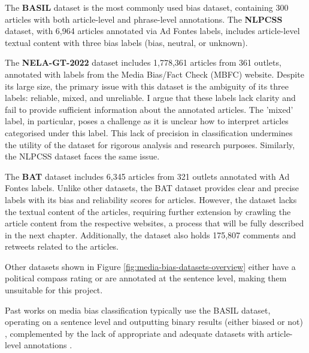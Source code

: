 The \textbf{BASIL} dataset \cite{fan-2019-basil} is the most commonly used bias dataset, containing 300 articles with both article-level and phrase-level annotations. The \textbf{NLPCSS} \cite{chen-2020-nlpcss} dataset, with 6,964 articles annotated via Ad Fontes labels, includes article-level textual content with three bias labels (bias, neutral, or unknown).

The \textbf{NELA-GT-2022} dataset \cite{gruppi-2023-nela-gt-2022} includes 1,778,361 articles from 361 outlets, annotated with labels from the Media Bias/Fact Check (MBFC) \cite{mbfc} website. Despite its large size, the primary issue with this dataset is the ambiguity of its three labels: reliable, mixed, and unreliable. I argue that these labels lack clarity and fail to provide sufficient information about the annotated articles. The 'mixed' label, in particular, poses a challenge as it is unclear how to interpret articles categorised under this label. This lack of precision in classification undermines the utility of the dataset for rigorous analysis and research purposes. Similarly, the NLPCSS dataset faces the same issue.

The \textbf{BAT} dataset \cite{spinde-2023-bat} includes 6,345 articles from 321 outlets annotated with Ad Fontes labels. Unlike other datasets, the BAT dataset provides clear and precise labels with its bias and reliability scores for articles. However, the dataset lacks the textual content of the articles, requiring further extension by crawling the article content from the respective websites, a process that will be fully described in the next chapter. Additionally, the dataset also holds 175,807 comments and retweets related to the articles.

Other datasets shown in Figure \ref{fig:media-bias-datasets-overview} either have a political compass rating or are annotated at the sentence level, making them unsuitable for this project.

Past works on media bias classification typically use the BASIL dataset, operating on a sentence level and outputting binary results (either biased or not) \cite{maab-2023-lexical-bias-detection, maab-2023-target-aware, guo-2022-modeling, van-den-berg-2020-context,lee-2021-unifying,lei-2022-sentence,lei-2024-event-relation,krieger-2022-domain}, complemented by the lack of appropriate and adequate datasets with article-level annotations \cite{demidov-2023-political-bias-classification}.

